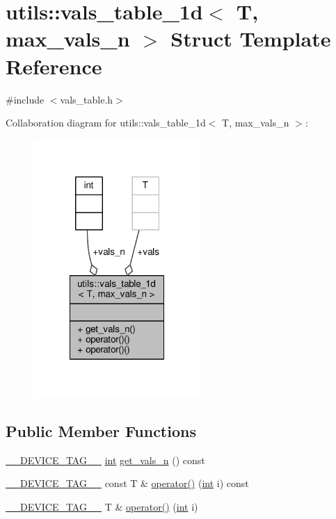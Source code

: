 \hypertarget{structutils_1_1vals__table__1d}{\section{utils\-:\-:vals\-\_\-table\-\_\-1d$<$ T, max\-\_\-vals\-\_\-n $>$ Struct Template Reference}
\label{structutils_1_1vals__table__1d}
}


{\ttfamily \#include $<$vals\-\_\-table.\-h$>$}



Collaboration diagram for utils\-:\-:vals\-\_\-table\-\_\-1d$<$ T, max\-\_\-vals\-\_\-n $>$\-:
\nopagebreak
\begin{figure}[H]
\begin{center}
\leavevmode
\includegraphics[width=180pt]{structutils_1_1vals__table__1d__coll__graph}
\end{center}
\end{figure}
\subsection*{Public Member Functions}
\begin{DoxyCompactItemize}
\item 
\hyperlink{scalar__traits_8h_a2396f3e69fc9792ad01b8b14a1a425e3}{\-\_\-\-\_\-\-D\-E\-V\-I\-C\-E\-\_\-\-T\-A\-G\-\_\-\-\_\-} \hyperlink{classint}{int} \hyperlink{structutils_1_1vals__table__1d_af700eb5a919edd9e38fb27769c908904}{get\-\_\-vals\-\_\-n} () const 
\item 
\hyperlink{scalar__traits_8h_a2396f3e69fc9792ad01b8b14a1a425e3}{\-\_\-\-\_\-\-D\-E\-V\-I\-C\-E\-\_\-\-T\-A\-G\-\_\-\-\_\-} const T \& \hyperlink{structutils_1_1vals__table__1d_a71aaf71ed5f894e41ef7f94c8a81693c}{operator()} (\hyperlink{classint}{int} i) const 
\item 
\hyperlink{scalar__traits_8h_a2396f3e69fc9792ad01b8b14a1a425e3}{\-\_\-\-\_\-\-D\-E\-V\-I\-C\-E\-\_\-\-T\-A\-G\-\_\-\-\_\-} T \& \hyperlink{structutils_1_1vals__table__1d_ae1074b2f845022a7492346400da6ff67}{operator()} (\hyperlink{classint}{int} i)
\end{DoxyCompactItemize}
